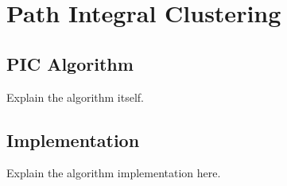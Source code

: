 \section{Path Integral Clustering}

\subsection{PIC Algorithm}
Explain the algorithm itself.

\subsection{Implementation}
Explain the algorithm implementation here.
